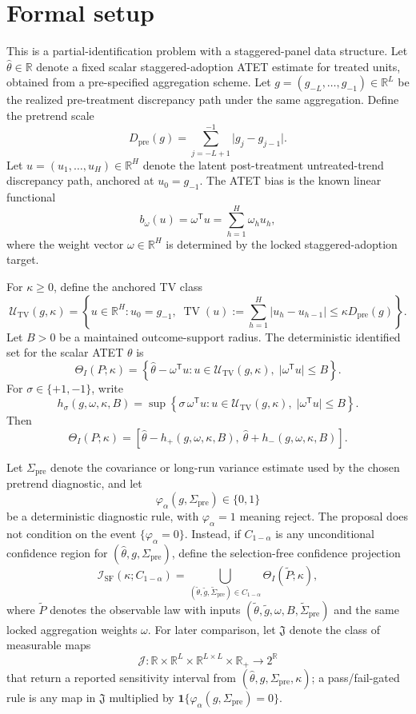\documentclass[11pt]{article}
\newcommand{\one}{\mathbf{1}}
\newcommand{\transpose}{\mathsf{T}}
\newcommand{\R}{\mathbb{R}}
\theoremstyle{definition}
\theoremstyle{plain}
\theoremstyle{remark}
\begin{document}
\section{Formal setup}
This is a partial-identification problem with a staggered-panel data structure. Let \(\hat\theta\in\R\) denote a fixed scalar staggered-adoption ATET estimate for treated units, obtained from a pre-specified aggregation scheme. Let \(g=(g_{-L},\ldots,g_{-1})\in\R^L\) be the realized pre-treatment discrepancy path under the same aggregation. Define the pretrend scale
\[
D_{\mathrm{pre}}(g)=\sum_{j=-L+1}^{-1}\lvert g_j-g_{j-1}\rvert .
\]
Let \(u=(u_1,\ldots,u_H)\in\R^H\) denote the latent post-treatment untreated-trend discrepancy path, anchored at \(u_0=g_{-1}\). The ATET bias is the known linear functional
\[
b_\omega(u)=\omega^\transpose u=\sum_{h=1}^H \omega_h u_h,
\]
where the weight vector \(\omega\in\R^H\) is determined by the locked staggered-adoption target.

For \(\kappa\ge 0\), define the anchored TV class
\[
\mathcal U_{\mathrm{TV}}(g,\kappa)
=
\left\{
u\in\R^H:
u_0=g_{-1},\;
\operatorname{TV}(u):=\sum_{h=1}^H \lvert u_h-u_{h-1}\rvert
\le \kappa D_{\mathrm{pre}}(g)
\right\}.
\]
Let \(B>0\) be a maintained outcome-support radius. The deterministic identified set for the scalar ATET \(\theta\) is
\[
\Theta_I(P;\kappa)
=
\left\{
\hat\theta-\omega^\transpose u:
u\in\mathcal U_{\mathrm{TV}}(g,\kappa),\;
\lvert \omega^\transpose u\rvert\le B
\right\}.
\]
For \(\sigma\in\{+1,-1\}\), write
\[
h_\sigma(g,\omega,\kappa,B)
=
\sup\left\{
\sigma\,\omega^\transpose u:
u\in\mathcal U_{\mathrm{TV}}(g,\kappa),\;
\lvert \omega^\transpose u\rvert\le B
\right\}.
\]
Then
\[
\Theta_I(P;\kappa)
=
[\hat\theta-h_{+}(g,\omega,\kappa,B),\ \hat\theta+h_{-}(g,\omega,\kappa,B)].
\]

Let \(\Sigma_{\mathrm{pre}}\) denote the covariance or long-run variance estimate used by the chosen pretrend diagnostic, and let
\[
\varphi_\alpha(g,\Sigma_{\mathrm{pre}})\in\{0,1\}
\]
be a deterministic diagnostic rule, with \(\varphi_\alpha=1\) meaning reject. The proposal does not condition on the event \(\{\varphi_\alpha=0\}\). Instead, if \(C_{1-\alpha}\) is any unconditional confidence region for \((\hat\theta,g,\Sigma_{\mathrm{pre}})\), define the selection-free confidence projection
\[
\mathcal I_{\mathrm{SF}}(\kappa;C_{1-\alpha})
=
\bigcup_{(\tilde\theta,\tilde g,\tilde\Sigma_{\mathrm{pre}})\in C_{1-\alpha}}
\Theta_I(\tilde P;\kappa),
\]
where \(\tilde P\) denotes the observable law with inputs
\((\tilde\theta,\tilde g,\omega,B,\tilde\Sigma_{\mathrm{pre}})\) and the same locked aggregation weights \(\omega\).
For later comparison, let \(\mathfrak J\) denote the class of measurable maps
\[
\mathcal J:\R\times\R^L\times\R^{L\times L}\times\R_+\to 2^{\R}
\]
that return a reported sensitivity interval from \((\hat\theta,g,\Sigma_{\mathrm{pre}},\kappa)\); a pass/fail-gated rule is any map in \(\mathfrak J\) multiplied by \(\one\{\varphi_\alpha(g,\Sigma_{\mathrm{pre}})=0\}\).
\end{document}
